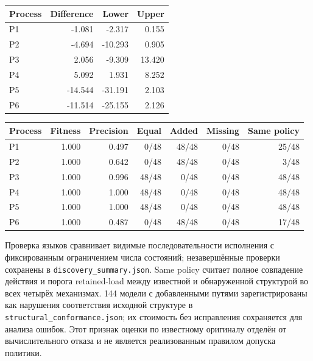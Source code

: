 \begin{center}\small\begin{tabular}{lrrr}\toprule

Process & Difference & Lower & Upper\\\midrule

P1 & -1.081 & -2.317 & 0.155\\

P2 & -4.694 & -10.293 & 0.905\\

P3 & 2.056 & -9.309 & 13.420\\

P4 & 5.092 & 1.931 & 8.252\\

P5 & -14.544 & -31.191 & 2.103\\

P6 & -11.514 & -25.155 & 2.126\\

\bottomrule\end{tabular}\end{center}

\begin{center}\small\begin{tabular}{lrrrrrr}\toprule

Process & Fitness & Precision & Equal & Added & Missing & Same policy\\\midrule

P1 & 1.000 & 0.497 & 0/48 & 48/48 & 0/48 & 25/48\\

P2 & 1.000 & 0.642 & 0/48 & 48/48 & 0/48 & 3/48\\

P3 & 1.000 & 0.996 & 48/48 & 0/48 & 0/48 & 48/48\\

P4 & 1.000 & 1.000 & 48/48 & 0/48 & 0/48 & 48/48\\

P5 & 1.000 & 1.000 & 48/48 & 0/48 & 0/48 & 48/48\\

P6 & 1.000 & 0.487 & 0/48 & 48/48 & 0/48 & 17/48\\

\bottomrule\end{tabular}\end{center}

Проверка языков сравнивает видимые последовательности исполнения с фиксированным ограничением числа состояний; незавершённые проверки сохранены в \texttt{discovery\_summary.json}. Same policy считает полное совпадение действия и порога retained-load между известной и обнаруженной структурой во всех четырёх механизмах. 144 модели с добавленными путями зарегистрированы как нарушения соответствия исходной структуре в \texttt{structural\_conformance.json}; их стоимость без исправления сохраняется для анализа ошибок. Этот признак оценки по известному оригиналу отделён от вычислительного отказа и не является реализованным правилом допуска политики.

